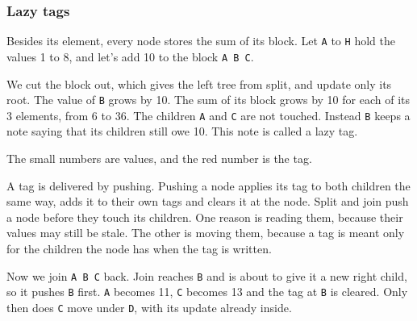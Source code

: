 \subsubsection{Lazy tags}
Besides its element, every node stores the sum of its block. Let \texttt{A} to \texttt{H} hold the values 1 to 8, and let's add 10 to the block \texttt{A B C}.

We cut the block out, which gives the left tree from split, and update only its root. The value of \texttt{B} grows by 10. The sum of its block grows by 10 for each of its 3 elements, from 6 to 36. The children \texttt{A} and \texttt{C} are not touched. Instead \texttt{B} keeps a note saying that its children still owe 10. This note is called a lazy tag.

\begin{center}
\end{center}
The small numbers are values, and the red number is the tag.

A tag is delivered by pushing. Pushing a node applies its tag to both children the same way, adds it to their own tags and clears it at the node. Split and join push a node before they touch its children. One reason is reading them, because their values may still be stale. The other is moving them, because a tag is meant only for the children the node has when the tag is written.

Now we join \texttt{A B C} back. Join reaches \texttt{B} and is about to give it a new right child, so it pushes \texttt{B} first. \texttt{A} becomes 11, \texttt{C} becomes 13 and the tag at \texttt{B} is cleared. Only then does \texttt{C} move under \texttt{D}, with its update already inside.

\begin{center}
\end{center}

